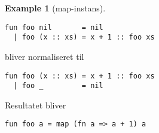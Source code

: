 \documentclass[oneside]{memoir}
\theoremstyle{definition}
\newtheorem{example}{Example}
\begin{document}
\begin{example}[\textsf{map}-instans]\
\begin{verbatim}
fun foo nil       = nil
  | foo (x :: xs) = x + 1 :: foo xs
\end{verbatim}

bliver normaliseret til

\begin{verbatim}
fun foo (x :: xs) = x + 1 :: foo xs
  | foo _         = nil
\end{verbatim}

Resultatet bliver

\begin{verbatim}
fun foo a = map (fn a => a + 1) a
\end{verbatim}


  


    
    
    
        
        
      
        

\end{example}
\end{document}
